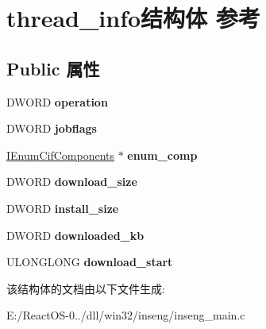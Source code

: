 \hypertarget{structthread__info}{}\section{thread\+\_\+info结构体 参考}
\label{structthread__info}
\subsection*{Public 属性}
\begin{DoxyCompactItemize}
\item 
\mbox{\label{structthread__info_a36b35b1a122674b15a012bd3abe22be8}} 
D\+W\+O\+RD {\bfseries operation}
\item 
\mbox{\label{structthread__info_adb902fe9c7e0820f21a2fec5ddb666ea}} 
D\+W\+O\+RD {\bfseries jobflags}
\item 
\mbox{\label{structthread__info_a8afd330ab3c0113c53ca8a0227e445b5}} 
\hyperlink{interface_i_enum_cif_components}{I\+Enum\+Cif\+Components} $\ast$ {\bfseries enum\+\_\+comp}
\item 
\mbox{\label{structthread__info_a0ea6104be6eb22579f95412905d908d7}} 
D\+W\+O\+RD {\bfseries download\+\_\+size}
\item 
\mbox{\label{structthread__info_ada66fbbd79adf6e7abeeb0b7abd2a1ad}} 
D\+W\+O\+RD {\bfseries install\+\_\+size}
\item 
\mbox{\label{structthread__info_af5295c68dba5b5f2f3af34e0a10bbb60}} 
D\+W\+O\+RD {\bfseries downloaded\+\_\+kb}
\item 
\mbox{\label{structthread__info_a15a2a293c83a7774d3b114f83b47a019}} 
U\+L\+O\+N\+G\+L\+O\+NG {\bfseries download\+\_\+start}
\end{DoxyCompactItemize}


该结构体的文档由以下文件生成\+:\begin{DoxyCompactItemize}
\item 
E\+:/\+React\+O\+S-\/0../dll/win32/inseng/inseng\+\_\+main.\+c\end{DoxyCompactItemize}

